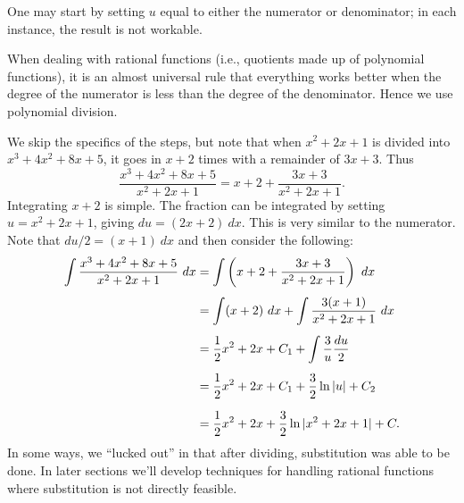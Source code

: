 {One may start by setting $u$ equal to either the numerator or denominator; in each instance, the result is not workable. 

When dealing with rational functions (i.e., quotients made up of polynomial functions), it is an almost universal rule that everything works better when the degree of the numerator is less than the degree of the denominator. Hence we use polynomial division.

We skip the specifics of the steps, but note that when $x^2+2x+1$ is divided into $x^3+4x^2+8x+5$, it goes in $x+2$ times with a remainder of $3x+3$. Thus 
	$$\frac{x^3+4x^2+8x+5}{x^2+2x+1} = x+2 + \frac{3x+3}{x^2+2x+1}.$$
Integrating $x+2$ is simple. The fraction can be integrated by setting $u = x^2+2x+1$, giving $du = (2x+2)\ dx$. This is very similar to the numerator. Note that $du/2 = (x+1)\ dx$ and then consider the following:
\begin{align*}
\int \frac{x^3+4x^2+8x+5}{x^2+2x+1}\ dx & = \int \left(x+2 + \frac{3x+3}{x^2+2x+1}\right)\ dx  \rule[-13pt]{0pt}{5pt} \\
					&= \int (x+2)\ dx + \int \frac{3(x+1)}{x^2+2x+1}\ dx  \rule[-13pt]{0pt}{5pt}\\
					& = \frac12x^2+2x+C_1 + \int \frac{3}{u}\frac{du}{2}  \rule[-13pt]{0pt}{5pt}\\
					&= \frac12x^2+2x+C_1 + \frac32\ln|u| + C_2 \rule[-13pt]{0pt}{5pt}\\
					&= \frac12x^2+2x+\frac32\ln|x^2+2x+1| + C.
\end{align*}
In some ways, we ``lucked out'' in that after dividing, substitution was able to be done. In later sections we'll develop techniques for handling rational functions where substitution is not directly feasible.
}\\

